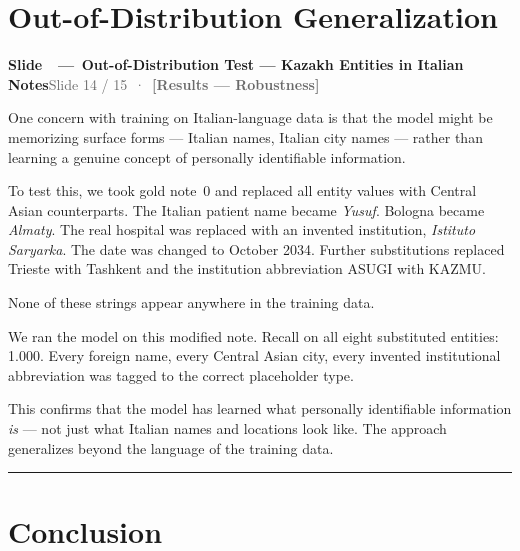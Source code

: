 \documentclass[11pt,a4paper]{article}
\newcommand{\phaselabel}[2]{\textbf{\textcolor{#1}{[#2]}}}
\newcounter{slidectr}
\newcommand{\slidescript}[3]{%
  \stepcounter{slidectr}
  \begin{slidebox}
    \noindent\textbf{Slide \theslidectr\ \,—\, #1}\hfill\small\textcolor{dimgray}{#2}
  \end{slidebox}
  \vspace{0.4em}
  #3
  \vspace{1.2em}
  \noindent\textcolor{dimgray!60}{\rule{\linewidth}{0.4pt}}
  \vspace{0.6em}
}
\begin{document}
\section{Out-of-Distribution Generalization}

\slidescript{Out-of-Distribution Test — Kazakh Entities in Italian Notes}{Slide 14 / 15 \,·\, \phaselabel{results}{Results — Robustness}}{

One concern with training on Italian-language data is that the model might be memorizing surface forms — Italian names, Italian city names — rather than learning a genuine concept of personally identifiable information.

To test this, we took gold note~0 and replaced all entity values with Central Asian counterparts. The Italian patient name became \emph{Yusuf}. Bologna became \emph{Almaty}. The real hospital was replaced with an invented institution, \emph{Istituto Saryarka}. The date was changed to October 2034. Further substitutions replaced Trieste with Tashkent and the institution abbreviation ASUGI with KAZMU.

None of these strings appear anywhere in the training data.

We ran the model on this modified note. Recall on all eight substituted entities: 1.000. Every foreign name, every Central Asian city, every invented institutional abbreviation was tagged to the correct placeholder type.

This confirms that the model has learned what personally identifiable information \emph{is} — not just what Italian names and locations look like. The approach generalizes beyond the language of the training data.

}

\section{Conclusion}
\end{document}
